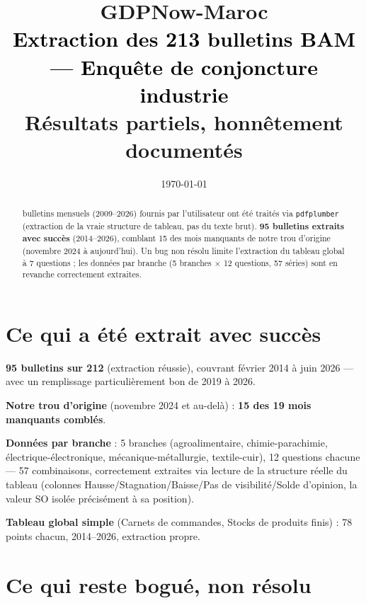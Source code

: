 \documentclass[11pt,a4paper]{article}
\title{\vspace{-1.3cm}\textcolor{bleuprincip}{\Huge\bfseries GDPNow-Maroc}\\[0.3cm]
\textcolor{black}{\Large Extraction des 213 bulletins BAM --- Enquête de conjoncture industrie}\\[0.15cm]
\textcolor{orangealerte}{\large Résultats partiels, honnêtement documentés}}
\author{}
\date{\today}
\begin{document}
\maketitle
\thispagestyle{empty}

\begin{abstract}
 bulletins mensuels (2009--2026) fournis par l'utilisateur ont été traités via \texttt{pdfplumber} (extraction de la vraie structure de tableau, pas du texte brut). \textbf{95 bulletins extraits avec succès} (2014--2026), comblant 15 des mois manquants de notre trou d'origine (novembre 2024 à aujourd'hui). Un bug non résolu limite l'extraction du tableau global à 7 questions ; les données par branche (5 branches × 12 questions, 57 séries) sont en revanche correctement extraites.
\end{abstract}

\section{Ce qui a été extrait avec succès}

\begin{fichebox}
\textbf{95 bulletins sur 212} (extraction réussie), couvrant février 2014 à juin 2026 --- avec un remplissage particulièrement bon de 2019 à 2026.

\textbf{Notre trou d'origine} (novembre 2024 et au-delà) : \textbf{15 des 19 mois manquants comblés}.

\textbf{Données par branche} : 5 branches (agroalimentaire, chimie-parachimie, électrique-électronique, mécanique-métallurgie, textile-cuir), 12 questions chacune --- 57 combinaisons, correctement extraites via lecture de la structure réelle du tableau (colonnes Hausse/Stagnation/Baisse/Pas de visibilité/Solde d'opinion, la valeur SO isolée précisément à sa position).

\textbf{Tableau global simple} (Carnets de commandes, Stocks de produits finis) : 78 points chacun, 2014--2026, extraction propre.
\end{fichebox}

\section{Ce qui reste bogué, non résolu}
\end{document}
